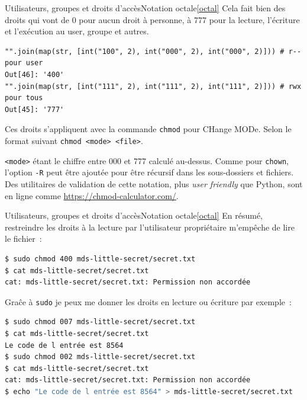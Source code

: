 \documentclass{beamer}
\begin{document}
    \begin{frame}[fragile]{Utilisateurs, groupes et droits d'accès}{Notation octale\cref{octal}}
        Cela fait bien des droits qui vont de 0 pour aucun droit à personne, à 777 pour la lecture, l'écriture et l'exécution au user, groupe et autres.
        \begin{lstlisting}
"".join(map(str, [int("100", 2), int("000", 2), int("000", 2)])) # r-- pour user
Out[46]: '400'
"".join(map(str, [int("111", 2), int("111", 2), int("111", 2)])) # rwx pour tous
Out[45]: '777'
        \end{lstlisting}
        Ces droits s'appliquent avec la commande \lstinline{chmod} pour CHange MODe.
        Selon le format suivant \lstinline{chmod <mode> <file>}.

        \lstinline{<mode>} étant le chiffre entre 000 et 777 calculé au-dessus.
        Comme pour \lstinline{chown}, l'option \lstinline{-R} peut être ajoutée pour être récursif dans les sous-dossiers et fichiers.
        \bigbreak
        Des utilitaires de validation de cette notation, plus \textit{user friendly} que Python, sont en ligne comme \url{https://chmod-calculator.com/}.
    \end{frame}

    \begin{frame}[fragile]{Utilisateurs, groupes et droits d'accès}{Notation octale\cref{octal}}
        En résumé, restreindre les droits à la lecture par l'utilisateur propriétaire m'empêche de lire le fichier~:
        \begin{lstlisting}[language=bash]
$ sudo chmod 400 mds-little-secret/secret.txt
$ cat mds-little-secret/secret.txt
cat: mds-little-secret/secret.txt: Permission non accordée
        \end{lstlisting}
        Graĉe à \lstinline{sudo} je peux me donner les droits en lecture ou écriture par exemple~:
        \begin{lstlisting}[language=bash]
$ sudo chmod 007 mds-little-secret/secret.txt
$ cat mds-little-secret/secret.txt
Le code de l entrée est 8564
$ sudo chmod 002 mds-little-secret/secret.txt
$ cat mds-little-secret/secret.txt
cat: mds-little-secret/secret.txt: Permission non accordée
$ echo "Le code de l entrée est 8564" > mds-little-secret/secret.txt
        \end{lstlisting}
    \end{frame}
\end{document}
